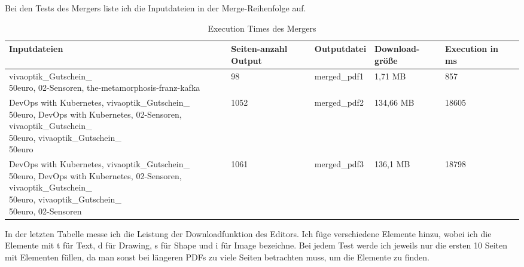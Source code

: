 Bei den Tests des Mergers liste ich die Inputdateien in der Merge-Reihenfolge auf.

\begin{table}[!htbp]
	\centering
	\begin{tabular}{|p{4cm}|p{1.7cm}|p{2.3cm}|p{2cm}|p{2cm}|p{2cm}|}
		\hline
		\textbf{Inputdateien}	& \textbf{Seiten-anzahl Output}		& \textbf{Outputdatei}		& \textbf{Download-größe}	& \textbf{Execution in ms} 	\\ 
		\hline
		\parbox[t]{4cm}{vivaoptik\_Gutschein\_\\50euro,} 02-Sensoren, the-metamorphosis-franz-kafka	& 98 & merged\_pdf1 & 1,71 MB		& 857  					\\
		DevOps with Kubernetes, \parbox[t]{4cm}{vivaoptik\_Gutschein\_\\50euro,} DevOps with Kubernetes, 02-Sensoren, \parbox[t]{4cm}{vivaoptik\_Gutschein\_\\50euro,} \parbox[t]{4cm}{vivaoptik\_Gutschein\_\\50euro}		& 1052 		& merged\_pdf2		& 134,66 MB		& 18605  						\\
		DevOps with Kubernetes, \parbox[t]{4cm}{vivaoptik\_Gutschein\_\\50euro,} DevOps with Kubernetes, 02-Sensoren, \parbox[t]{4cm}{vivaoptik\_Gutschein\_\\50euro,} \parbox[t]{4cm}{vivaoptik\_Gutschein\_\\50euro,} 02-Sensoren		& 1061 		& merged\_pdf3				& 136,1 MB					& 18798  						\\
		\hline
	\end{tabular}
	\caption{Execution Times des Mergers}
	\label{table:merger-dur}
\end{table}

In der letzten Tabelle messe ich die Leistung der Downloadfunktion des Editors. Ich füge verschiedene Elemente hinzu, wobei ich die Elemente mit t für Text, d für Drawing, s für Shape und i für Image bezeichne. Bei jedem Test werde ich jeweils nur die ersten 10 Seiten mit Elementen füllen, da man sonst bei längeren PDFs zu viele Seiten betrachten muss, um die Elemente zu finden. 


